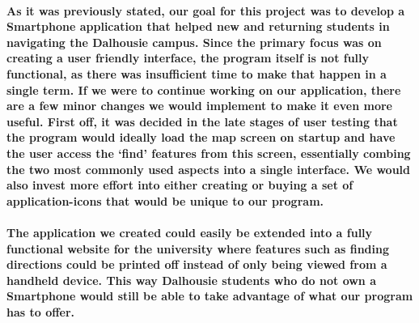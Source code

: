 \documentclass{report}
\begin{document}
    \paragraph{As it was previously stated, our goal for this project was to develop
    a Smartphone application that helped new and returning students in navigating
    the Dalhousie campus. Since the primary focus was on creating a user friendly
    interface, the program itself is not fully functional, as there was insufficient
    time to make that happen in a single term. If we were to continue working on our
    application, there are a few minor changes we would implement to make it even
    more useful. First off, it was decided in the late stages of user testing that
    the program would ideally load the map screen on startup and have the user
    access the ‘find’ features from this screen, essentially combing the two most
    commonly used aspects into a single interface. We would also invest more effort
    into either creating or buying a set of application-icons that would be unique
    to our program.}
    \paragraph{The application we created could easily be extended into a fully
    functional website for the university where features such as finding directions
    could be printed off instead of only being viewed from a handheld device. This
    way Dalhousie students who do not own a Smartphone would still be able to take
    advantage of what our program has to offer.}
{}

\end{document}
